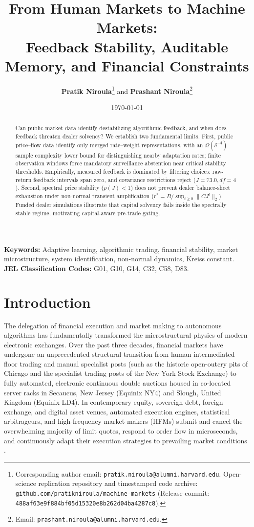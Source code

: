 \documentclass[12pt]{article}
\title{\textbf{From Human Markets to Machine Markets:}\\[0.3em]
\Large Feedback Stability, Auditable Memory, and Financial Constraints}
\author{\textbf{Pratik Niroula}\thanks{Corresponding author email: \texttt{pratik.niroula@alumni.harvard.edu}. Open-science replication repository and timestamped code archive: \texttt{github.com/pratikniroula/machine-markets} (Release commit: \texttt{488af63e9f884bf05d15320e8b262d04ba4287c8}).} \quad and \quad \textbf{Prashant Niroula}\thanks{Email: \texttt{prashant.niroula@alumni.harvard.edu}.}}
\date{\today}
\theoremstyle{definition}
\theoremstyle{remark}
\begin{document}
\maketitle
\thispagestyle{empty}

\vspace{-0.5em}
\begin{abstract}
\noindent Can public market data identify destabilizing algorithmic feedback, and when does feedback threaten dealer solvency? We establish two fundamental limits. First, public price--flow data identify only merged rate--weight representations, with an $\Omega(\delta^{-4})$ sample complexity lower bound for distinguishing nearby adaptation rates; finite observation windows force mandatory surveillance abstention near critical stability thresholds. Empirically, measured feedback is dominated by filtering choices: raw-return feedback intervals span zero, and covariance restrictions reject ($J=73.0, df=4$). Second, spectral price stability ($\rho(J)<1$) does not prevent dealer balance-sheet exhaustion under non-normal transient amplification ($r^* = B / \sup_{t \ge 0} \|C J^t\|_2$). Funded dealer simulations illustrate that capital solvency fails inside the spectrally stable regime, motivating capital-aware pre-trade gating.
\end{abstract}

\vspace{1.0em}
\noindent\textbf{Keywords:} Adaptive learning, algorithmic trading, financial stability, market microstructure, system identification, non-normal dynamics, Kreiss constant.\\
\textbf{JEL Classification Codes:} G01, G10, G14, C32, C58, D83.

\newpage
\setcounter{page}{1}

\section{Introduction}
\label{sec:intro}

The delegation of financial execution and market making to autonomous algorithms has fundamentally transformed the microstructural physics of modern electronic exchanges. Over the past three decades, financial markets have undergone an unprecedented structural transition from human-intermediated floor trading and manual specialist posts (such as the historic open-outcry pits of Chicago and the specialist trading posts of the New York Stock Exchange) to fully automated, electronic continuous double auctions housed in co-located server racks in Secaucus, New Jersey (Equinix NY4) and Slough, United Kingdom (Equinix LD4). In contemporary equity, sovereign debt, foreign exchange, and digital asset venues, automated execution engines, statistical arbitrageurs, and high-frequency market makers (HFMs) submit and cancel the overwhelming majority of limit quotes, respond to order flow in microseconds, and continuously adapt their execution strategies to prevailing market conditions \citep{hasbrouck1991,menkveld2013,budish2015,biais2015}.
\end{document}
